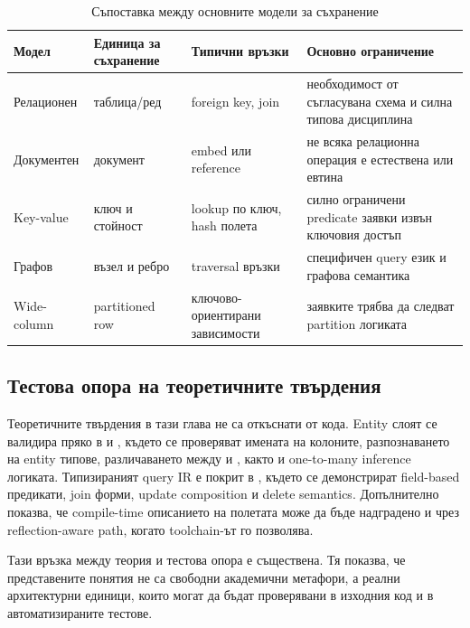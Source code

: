\begin{table}[H]
\centering
\small
\caption{Съпоставка между основните модели за съхранение}
\label{tab:storage_models}
\begin{tabularx}{\textwidth}{L{2.3cm}L{2.7cm}L{2.8cm}Y}
\toprule
\textbf{Модел} & \textbf{Единица за съхранение} & \textbf{Типични връзки} & \textbf{Основно ограничение} \\
\midrule
Релационен & таблица/ред & foreign key, join & необходимост от съгласувана схема и силна типова дисциплина \\
Документен & документ & embed или reference & не всяка релационна операция е естествена или евтина \\
Key-value & ключ и стойност & lookup по ключ, hash полета & силно ограничени predicate заявки извън ключовия достъп \\
Графов & възел и ребро & traversal връзки & специфичен query език и графова семантика \\
Wide-column & partitioned row & ключово-ориентирани зависимости & заявките трябва да следват partition логиката \\
\bottomrule
\end{tabularx}
\end{table}

\subsection{Тестова опора на теоретичните твърдения}

Теоретичните твърдения в тази глава не са откъснати от кода. Entity слоят се валидира пряко в  и , където се проверяват имената на колоните, разпознаването на entity типове, различаването между  и , както и one-to-many inference логиката. Типизираният query IR е покрит в , където се демонстрират field-based предикати, join форми, update composition и delete semantics. Допълнително  показва, че compile-time описанието на полетата може да бъде надградено и чрез reflection-aware path, когато toolchain-ът го позволява.

Тази връзка между теория и тестова опора е съществена. Тя показва, че представените понятия не са свободни академични метафори, а реални архитектурни единици, които могат да бъдат проверявани в изходния код и в автоматизираните тестове.

